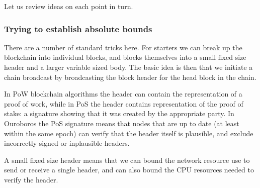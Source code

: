 \documentclass{article}
\theoremstyle{definition}{
  \newtheorem{lemma}{Lemma}[section] %
  \newtheorem{definition}[lemma]{Definition}
}
\theoremstyle{theorem}{
  \newtheorem{invariant}[lemma]{Invariant}
  \newtheorem{proofobligation}[lemma]{Proof Obligation}
}
\numberwithin{equation}{lemma}
\begin{document}
Let us review ideas on each point in turn.

\subsubsection{Trying to establish absolute bounds}

There are a number of standard tricks here. For starters we can break up the
blockchain into individual blocks, and blocks themselves into a small fixed
size header and a larger variable sized body. The basic idea is then that we
initiate a chain broadcast by broadcasting the block header for the head block
in the chain.

In PoW blockchain algorithms the header can contain the representation of a
proof of work, while in PoS the header contains representation of the proof of
stake: a signature showing that it was created by the appropriate party. In
Ouroboros the PoS signature means that nodes that are up to date (at least
within the same epoch) can verify that the header itself is plausible, and
exclude incorrectly signed or inplausible headers.

A small fixed size header means that we can bound the network resource use
to send or receive a single header, and can also bound the CPU resources needed
to verify the header.
\end{document}
